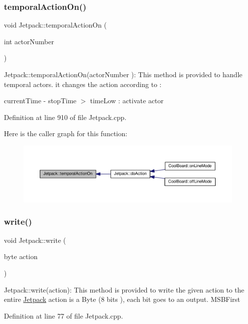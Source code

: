 \subsubsection{\texorpdfstring{temporal\+Action\+On()}{temporalActionOn()}}
{\footnotesize\ttfamily void Jetpack\+::temporal\+Action\+On (\begin{DoxyParamCaption}\item[{int}]{actor\+Number }\end{DoxyParamCaption})}

Jetpack\+::temporal\+Action\+On(actor\+Number )\+: This method is provided to handle temporal actors. it changes the action according to \+:

current\+Time -\/ stop\+Time $>$ time\+Low \+: activate actor 

Definition at line 910 of file Jetpack.\+cpp.

Here is the caller graph for this function\+:\nopagebreak
\begin{figure}[H]
\begin{center}
\leavevmode
\includegraphics[width=350pt]{class_jetpack_ad011d904f639accb5f94ef806846ef59_icgraph}
\end{center}
\end{figure}
\mbox{\label{class_jetpack_a338f1af8cbc6504ac69b47c7328569b5}} 
\subsubsection{\texorpdfstring{write()}{write()}}
{\footnotesize\ttfamily void Jetpack\+::write (\begin{DoxyParamCaption}\item[{byte}]{action }\end{DoxyParamCaption})}

Jetpack\+::write(action)\+: This method is provided to write the given action to the entire \hyperlink{class_jetpack}{Jetpack} action is a Byte (8 bits ), each bit goes to an output. M\+S\+B\+First 

Definition at line 77 of file Jetpack.\+cpp.

